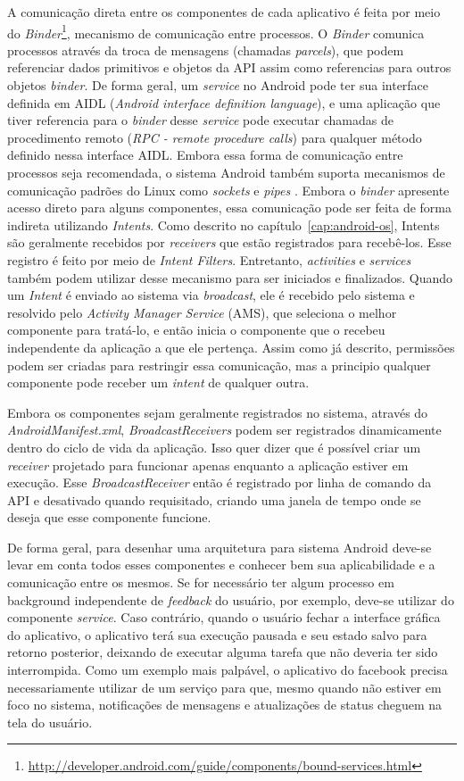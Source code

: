 A comunicação direta entre os componentes de cada aplicativo é feita por meio do \textit{Binder}\footnote{\url{http://developer.android.com/guide/components/bound-services.html}}, mecanismo de comunicação entre processos. O \textit{Binder} comunica processos através da troca de mensagens (chamadas \textit{parcels}), que podem referenciar dados primitivos e objetos da API assim como referencias para outros objetos \textit{binder}. De forma geral, um \textit{service} no Android pode ter sua interface definida em AIDL (\textit{Android interface definition language}), e uma aplicação que tiver referencia para o \textit{binder} desse \textit{service} pode executar chamadas de procedimento remoto (\textit{RPC - remote procedure calls}) para qualquer método definido nessa interface AIDL. Embora essa forma de comunicação entre processos seja recomendada, o sistema Android também suporta mecanismos de comunicação padrões do Linux como \textit{sockets} e \textit{pipes} \cite{heuser2014}. Embora o \textit{binder} apresente acesso direto para alguns componentes, essa comunicação pode ser feita de forma indireta utilizando \textit{Intents}. Como descrito no capítulo~\ref{cap:android-os}, Intents são geralmente recebidos por \textit{receivers} que estão registrados para recebê-los. Esse registro é feito por meio de \textit{Intent Filters}. Entretanto, \textit{activities} e \textit{services} também podem utilizar desse mecanismo para ser iniciados e finalizados. Quando um \textit{Intent} é enviado ao sistema via \textit{broadcast}, ele é recebido pelo sistema e resolvido pelo \textit{Activity Manager Service} (AMS), que seleciona o melhor componente para tratá-lo, e então inicia o componente que o recebeu independente da aplicação a que ele pertença. Assim como já descrito, permissões podem ser criadas para restringir essa comunicação, mas a principio qualquer componente pode receber um \textit{intent} de qualquer outra. 

Embora os componentes sejam geralmente registrados no sistema, através do \textit{AndroidManifest.xml}, \textit{BroadcastReceivers} podem ser registrados dinamicamente dentro do ciclo de vida da aplicação. Isso quer dizer que é possível criar um \textit{receiver} projetado para funcionar apenas enquanto a aplicação estiver em execução. Esse \textit{BroadcastReceiver} então é registrado por linha de comando da API e desativado quando requisitado, criando uma janela de tempo onde se deseja que esse componente funcione.

De forma geral, para desenhar uma arquitetura para sistema Android deve-se levar em conta todos esses componentes e conhecer bem sua aplicabilidade e a comunicação entre os mesmos. Se for necessário ter algum processo em background independente de \textit{feedback} do usuário, por exemplo, deve-se utilizar do componente \textit{service}. Caso contrário, quando o usuário fechar a interface gráfica do aplicativo, o aplicativo terá sua execução pausada e seu estado salvo para retorno posterior, deixando de executar alguma tarefa que não deveria ter sido interrompida. Como um exemplo mais palpável, o aplicativo do facebook precisa necessariamente utilizar de um serviço para que, mesmo quando não estiver em foco no sistema, notificações de mensagens e atualizações de status cheguem na tela do usuário.

